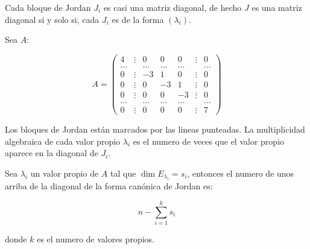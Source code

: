 		\begin{observacion}
			Cada bloque de Jordan $J_i$ es casi una matriz diagonal, de hecho $J$ es una matriz diagonal si y solo si, cada $J_i$ es de la forma $(\lambda_i)$.
		\end{observacion}

		\begin{ejemplo}
			Sea $A$:

			\begin{equation*}
				A =
				\begin{pmatrix}
					4 & \vdots & 0 & 0 & 0 & \vdots & 0 \\
					\dots & & \dots & \dots & \dots & & \dots \\
					0 & \vdots & -3 & 1 & 0 & \vdots & 0 \\
					0 & \vdots & 0 & -3 & 1 & \vdots & 0 \\
					0 & \vdots & 0 & 0 & -3 & \vdots & 0 \\
					\dots & & \dots & \dots & \dots & & \dots \\
					0 & \vdots & 0 & 0 & 0 & \vdots & 7 
				\end{pmatrix}
			\end{equation*}

			Los bloques de Jordan están marcados por las lineas punteadas.
			La multiplicidad algebraica de cada valor propio $\lambda_i$ es el numero de veces que el valor propio aparece en la diagonal de $J_i$.
		\end{ejemplo}

		\begin{proposicion}
			Sea $\lambda_i$ un valor propio de $A$ tal que $\dim{E_{\lambda_i}} = s_i$, entonces el numero de unos arriba de la diagonal de la forma canónica de Jordan es:

			\begin{equation}
				n - \sum_{i=1}^k s_i
			\end{equation}

			donde $k$ es el numero de valores propios.
		\end{proposicion}

